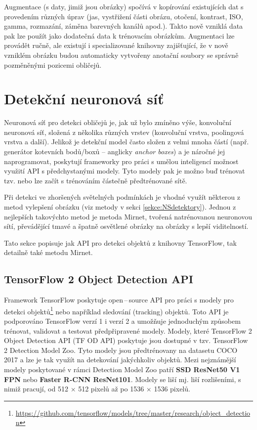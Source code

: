 Augmentace (s daty, jimiž jsou obrázky) spočívá v kopírování existujících dat s provedením různých úprav (jas, vystřižení části obrázu, otočení, kontrast, ISO, gamma, rozmazání, záměna barevných kanálů apod.). Takto nově vzniklá data pak lze použít jako dodatečná data k trénovacím obrázkům. Augmentaci lze provádět ručně, ale existují i specializované knihovny zajišťující, že v nově vzniklém obrázku budou automaticky vytvořeny anotační soubory se správně pozměněnými pozicemi obličejů.

\section{Detekční neuronová síť}
\label{sekce:detekcni_sit_navrh}
Neuronová síť pro detekci obličejů je, jak už bylo zmíněno výše, konvoluční neuronová síť, složená z několika různých vrstev (konvoluční vrstva, poolingová vrstva a další). Jelikož je detekční model často složen z velmi mnoha částí (např. generátor kotevních bodů/boxů -- anglicky \emph{anchor boxes}) a je náročné jej naprogramovat, poskytují frameworky pro práci s umělou inteligencí možnost využití API s předchystanými modely. Tyto modely pak je možno buď trénovat tzv.  nebo lze začít s trénováním částečně předtrénované sítě.

Při detekci ve zhoršených světelných podmínkách je vhodné využít některou z metod vylepšení obrázku (viz metody v sekci \ref{sekce:NSdetektory}). Jednou z nejlepších takovýchto metod je metoda Mirnet, tvořená natrénovanou neuronovou sítí, převádějící tmavé a špatně osvětlené obrázky na obrázky s lepší viditelností.

Tato sekce popisuje jak API pro detekci objektů z knihovny TensorFlow, tak detailně také metodu Mirnet.

\subsection*{TensorFlow 2 Object Detection API}
Framework TensorFlow poskytuje open\,--\,source API pro práci s modely pro detekci objektů\footnote{\url{https://github.com/tensorflow/models/tree/master/research/object_detection}} nebo například sledování (tracking) objektů. Toto API je podporováno TensorFlow verzí 1 i verzí 2 a umožňuje jednoduchým způsobem trénovat, validovat a testovat předpřipravené modely. Modely, které TensorFlow 2 Object Detection API (TF OD API) poskytuje jsou dostupné v tzv. TensorFlow 2 Detection Model Zoo. Tyto modely jsou předtrénovany na datasetu COCO 2017 a lze je tak využít na detekování jakýchkoliv objektů. Mezi nejznámější modely poskytované v rámci Detection Model Zoo patří \textbf{SSD ResNet50 V1 FPN} nebo \textbf{Faster R-CNN ResNet101}. Modely se liší mj. liší rozlišeními, s nimiž pracují, od 512 $\times$ 512 pixelů až po 1536 $\times$ 1536 pixelů.

